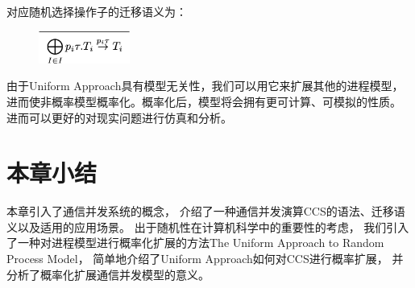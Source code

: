    对应随机选择操作子的迁移语义为：
   \begin{figure}[!htbp]
    \small
    \centering
    \includegraphics[width=3cm]{../figure/rccs.png}
    \caption[]{}
     \label{fig_rccs}
 \end{figure}

   由于Uniform Approach具有模型无关性，我们可以用它来扩展其他的进程模型，
   进而使非概率模型概率化。概率化后，模型将会拥有更可计算、可模拟的性质。
   进而可以更好的对现实问题进行仿真和分析。

\section{本章小结}
本章引入了通信并发系统的概念，
介绍了一种通信并发演算CCS的语法、迁移语义以及适用的应用场景。
出于随机性在计算机科学中的重要性的考虑，
我们引入了一种对进程模型进行概率化扩展的方法The Uniform Approach to Random Process Model，
简单地介绍了Uniform Approach如何对CCS进行概率扩展，
并分析了概率化扩展通信并发模型的意义。